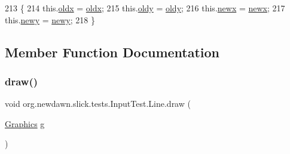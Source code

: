 \begin{DoxyCode}
213                                                           \{
214             this.\mbox{\hyperlink{classorg_1_1newdawn_1_1slick_1_1tests_1_1_input_test_1_1_line_a7c4b8907da6261784c6f61ad8379cbc3}{oldx}} = \mbox{\hyperlink{classorg_1_1newdawn_1_1slick_1_1tests_1_1_input_test_1_1_line_a7c4b8907da6261784c6f61ad8379cbc3}{oldx}};
215             this.\mbox{\hyperlink{classorg_1_1newdawn_1_1slick_1_1tests_1_1_input_test_1_1_line_a7349c6da68a0a57fe7687f10c0af912f}{oldy}} = \mbox{\hyperlink{classorg_1_1newdawn_1_1slick_1_1tests_1_1_input_test_1_1_line_a7349c6da68a0a57fe7687f10c0af912f}{oldy}};
216             this.\mbox{\hyperlink{classorg_1_1newdawn_1_1slick_1_1tests_1_1_input_test_1_1_line_ab23fd0b59d5b413dc26c0c86a5f62ba3}{newx}} = \mbox{\hyperlink{classorg_1_1newdawn_1_1slick_1_1tests_1_1_input_test_1_1_line_ab23fd0b59d5b413dc26c0c86a5f62ba3}{newx}};
217             this.\mbox{\hyperlink{classorg_1_1newdawn_1_1slick_1_1tests_1_1_input_test_1_1_line_ada907433d8d222da630e7aabf5f77206}{newy}} = \mbox{\hyperlink{classorg_1_1newdawn_1_1slick_1_1tests_1_1_input_test_1_1_line_ada907433d8d222da630e7aabf5f77206}{newy}};
218         \}
\end{DoxyCode}


\subsection{Member Function Documentation}
\mbox{\label{classorg_1_1newdawn_1_1slick_1_1tests_1_1_input_test_1_1_line_aba1ebddf15932f0bb1e2441d1bddb271}} 
\subsubsection{\texorpdfstring{draw()}{draw()}}
{\footnotesize\ttfamily void org.\+newdawn.\+slick.\+tests.\+Input\+Test.\+Line.\+draw (\begin{DoxyParamCaption}\item[{\mbox{\hyperlink{classorg_1_1newdawn_1_1slick_1_1_graphics}{Graphics}}}]{g }\end{DoxyParamCaption})\hspace{0.3cm}{\ttfamily [inline]}}


